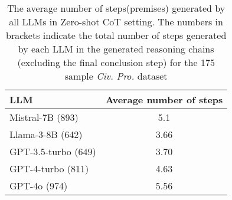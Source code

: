 \begin{table}[!htbp]
\small
\centering
\begin{tabular}{lc}
\toprule
LLM   & Average number of steps\\ 
\midrule
Mistral-7B (893)   & 5.1\\  
Llama-3-8B (642)   & 3.66\\
GPT-3.5-turbo (649)   & 3.70\\
GPT-4-turbo (811)     & 4.63\\ 
GPT-4o (974)   & 5.56\\
\bottomrule
\end{tabular}
\caption{The average number of steps(premises) generated by all LLMs in Zero-shot CoT setting. The numbers in brackets indicate the total number of steps generated by each LLM in the generated reasoning chains (excluding the final conclusion step) for the 175 sample \textit{Civ. Pro.} dataset}
\label{table:average_steps}
\end{table}